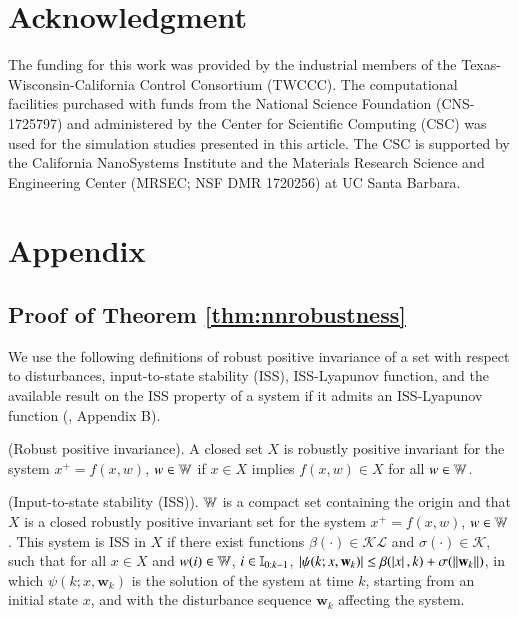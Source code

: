 \documentclass[preprint,5p, twocolumn, authoryear]{elsarticle}
\begin{document}
\section*{Acknowledgment}
The funding for this work was provided by the industrial
members of the Texas-Wisconsin-California Control 
Consortium (TWCCC).
The computational facilities purchased with funds from the National Science Foundation (CNS-1725797) and 
administered by the Center for Scientific Computing (CSC) was used for the simulation 
studies presented in this article. 
The CSC is supported by the California NanoSystems Institute and the Materials 
Research Science and Engineering Center 
(MRSEC; NSF DMR 1720256) at UC Santa Barbara.




\section*{Appendix}
\renewcommand{\thesubsection}{\Alph{subsection}}

\subsection{Proof of Theorem \ref{thm:nnrobustness}} \label{app:theorem1}

We use the following
definitions of
robust positive invariance of a set
with respect to disturbances, 
input-to-state stability (ISS), ISS-Lyapunov function,
and the available result 
on the ISS property of a system if it admits 
an ISS-Lyapunov function
(\cite*{jiang:wang:2001, 
rawlings:mayne:diehl:2017}, Appendix B).

\begin{definition} \label{def:robust_pos_invariance}
(Robust positive invariance). A closed set $X$ is 
robustly positive invariant for the system $x^+ = f(x, w)$, 
$w \in \mathbb{W}$ if $x \in X$ 
implies $f(x, w) \in X$ for all $w \in \mathbb{W}$.
\end{definition}

\begin{definition} \label{def:iss}
(Input-to-state stability (ISS)). $\mathbb{W}$ is a compact 
set containing the origin and that $X$ is a closed robustly
positive invariant set for the 
system $x^+ = f(x, w)$, $w \in \mathbb{W}$. This
system is ISS in $X$ if there exist functions 
$\beta(\cdot) \in \mathcal{K}\mathcal{L}$ and 
$\sigma(\cdot) \in \mathcal{K}$, such that for all
$x \in X$ and $w(i) \in \mathbb{W}$, $i \in \mathbb{I}_{0:k-1}$, 
$\left| \psi(k; x, \mathbf{w}_k) \right| \leq \beta(\left| x \right|, k) 
+ \sigma(\left| \left| \mathbf{w}_k \right| \right|)$, in which 
$\psi(k; x, \mathbf{w}_k)$ is the solution of the system 
at time $k$, starting from an initial state $x$, and with the
disturbance sequence $\mathbf{w}_k$ affecting the system.
\end{definition}
\end{document}
